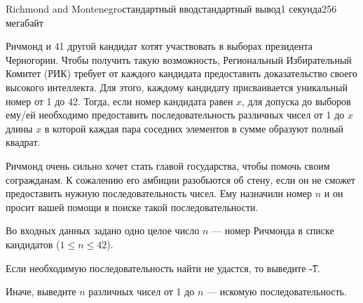 \begin{problem}{Richmond and Montenegro}{стандартный ввод}{стандартный вывод}{1 секунда}{256 мегабайт}

Ричмонд и 41 другой кандидат хотят участвовать в выборах президента Черногории. Чтобы получить такую возможность, Региональный Избирательный Комитет (РИК) требует от каждого кандидата предоставить доказательство своего высокого интеллекта. Для этого, каждому кандидату присваивается уникальный номер от 1 до 42. Тогда, если номер кандидата равен $x$,  для допуска до выборов ему/ей необходимо предоставить последовательность различных чисел от 1 до $x$ длины $x$ в которой каждая пара соседних элементов в сумме образуют полный квадрат.

Ричмонд очень сильно хочет стать главой государства, чтобы помочь своим согражданам. К сожалению его амбиции разобьются об стену, если он не сможет предоставить нужную последовательность чисел. Ему назначили номер $n$ и он просит вашей помощи в поиске такой последовательности.

\InputFile
Во входных данных задано одно целое число $n$ --- номер Ричмонда в списке кандидатов ($1 \le n \le 42$).

\OutputFile
Если необходимую последовательность найти не удастся, то выведите \t{-1}.

Иначе, выведите $n$ различных чисел от 1 до $n$ --- искомую последовательность.

\Examples

\begin{example}
%
%
%
\end{example}

\end{problem}

